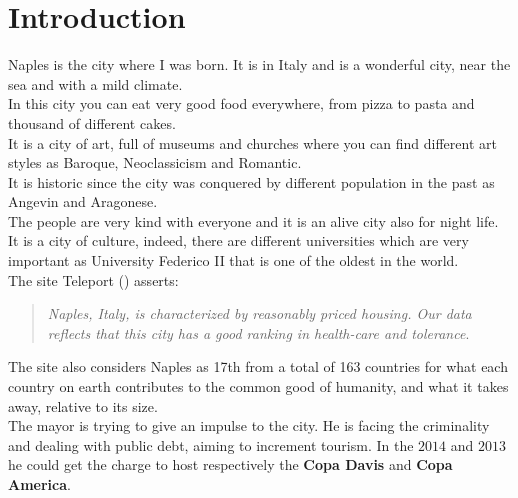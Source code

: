 \documentclass[a4paper, 12pt, oneside]{book}
\begin{document}
\setcounter{page}{1}
\tableofcontents %

\chapter*{Introduction}
\setcounter{page}{1}

\markboth{}{}
\label{ch:Introduction}
Naples is the city where I was born. It is in Italy and is a wonderful city, near the sea and with a mild climate.\\ 

In this city you can eat very good food everywhere, from pizza to pasta and thousand of different cakes.\\ 

It is a city of art, full of museums and churches where you can find different art styles as Baroque, Neoclassicism and Romantic.\\

It is historic since the city was conquered by different population in the past as Angevin and Aragonese.\\ 

The people are very kind with everyone and it is an alive city also for night life.\\

It is a city of culture, indeed, there are different universities which are very important as University Federico II that is one of the oldest in the world.\\

The site Teleport (\cite{Teleport}) asserts:
\begin{quote}
\textit{Naples, Italy, is characterized by reasonably priced housing. Our data reflects that this city has a good ranking in health-care and tolerance}.
\end{quote}
The site also considers Naples as 17th from a total of 163 countries for what each country on earth contributes to the common good of humanity, and what it takes away, relative to its size.\\

The mayor is trying to give an impulse to the city. He is facing the criminality and dealing with public debt, aiming to increment tourism. In the $2014$ and $2013$ he could get the charge to host respectively the \textbf{Copa Davis} and \textbf{Copa America}.\\
\end{document}
